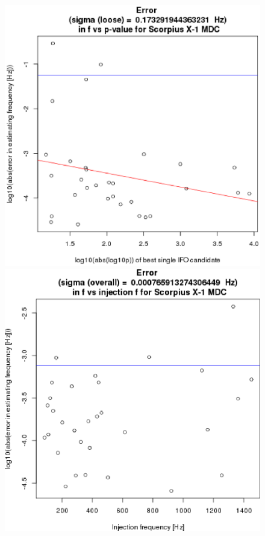 \begin{figure}
\begin{center}
\includegraphics[width=0.5\paperwidth,height=0.35\paperheight]{ErrorF.eps}
\includegraphics[width=0.5\paperwidth,height=0.35\paperheight]{plots/ErrorFvsF-overall.eps}

\end{center}
\end{figure}
